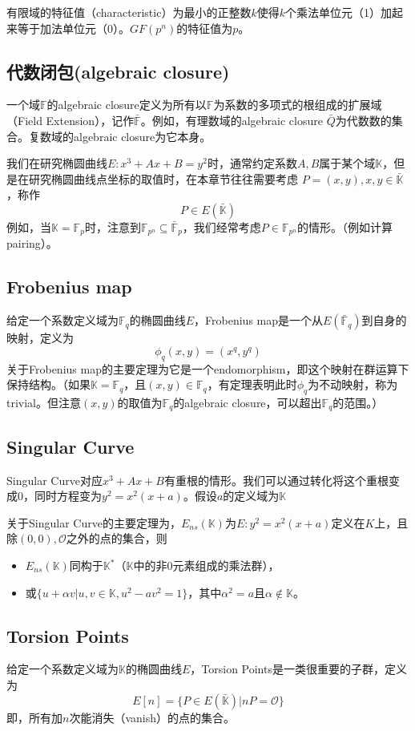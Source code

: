 \documentclass[12pt]{article}
\newcommand{\ec}{椭圆曲线}
\newcommand{\oo}{\mathcal{O}}
\newcommand{\fp}{\mathbb{F}_p}
\newcommand{\fpn}{\mathbb{F}_{p^n}}
\newcommand{\fq}{\mathbb{F}_q}
\begin{document}
有限域的特征值（characteristic）为最小的正整数$k$使得$k$个乘法单位元（1）加起来等于加法单位元（0）。$GF(p^n)$的特征值为$p$。
\subsection{代数闭包(algebraic closure)}
一个域$\mathbb{F}$的algebraic closure定义为所有以$\mathbb{F}$为系数的多项式的根组成的扩展域（Field Extension），记作$\bar{\mathbb{F}}$。例如，有理数域的algebraic closure $\bar{Q}$为代数数的集合。复数域的algebraic closure为它本身。

我们在研究\ec $E:x^3+Ax+B=y^2$时，通常约定系数$A,B$属于某个域$\mathbb{K}$，但是在研究\ec 点坐标的取值时，在本章节往往需要考虑
$P = (x,y), x,y \in \bar{\mathbb{K}}$，称作
$$P \in E(\bar{\mathbb{K}})$$
例如，当$\mathbb{K}=\fp$时，注意到$\fpn \subseteq \bar{\mathbb{F}}_p$，我们经常考虑$P \in \fpn$的情形。（例如计算pairing）。
\subsection{Frobenius map}
给定一个系数定义域为$\mathbb{F}_q$的椭圆曲线$E$，Frobenius map是一个从$E(\bar{\mathbb{F}}_q)$到自身的映射，定义为
$$\phi_q(x,y) = (x^q,y^q)$$
关于Frobenius map的主要定理为它是一个endomorphism，即这个映射在群运算下保持结构。（如果$\mathbb{K}=\fq$，且$(x,y) \in \fq$，有定理表明此时$\phi_q$为不动映射，称为trivial。但注意$(x,y)$的取值为$\fq$的algebraic closure，可以超出$\fq$的范围。）
\subsection{Singular Curve}
Singular Curve对应$x^3+Ax+B$有重根的情形。我们可以通过转化将这个重根变成0，同时方程变为$y^2=x^2(x+a)$。假设$a$的定义域为$\mathbb{K}$

关于Singular Curve的主要定理为，$E_{ns}(\mathbb{K})$为$E:y^2=x^2(x+a)$定义在$K$上，且除$(0,0),\oo$之外的点的集合，则
\begin{itemize}
\item $E_{ns}(\mathbb{K})$同构于$\mathbb{K}^*$（$\mathbb{K}$中的非0元素组成的乘法群），
\item 或$\{u+\alpha v |u,v \in \mathbb{K}, u^2-av^2 = 1\}$，其中$\alpha^2 = a$且$\alpha \notin \mathbb{K}$。
\end{itemize}
\subsection{Torsion Points}
给定一个系数定义域为$\mathbb{K}$的椭圆曲线$E$，Torsion Points是一类很重要的子群，定义为
$$E[n] = \{P \in E(\bar{\mathbb{K}})| nP = \oo \}$$
即，所有加$n$次能消失（vanish）的点的集合。
\end{document}
